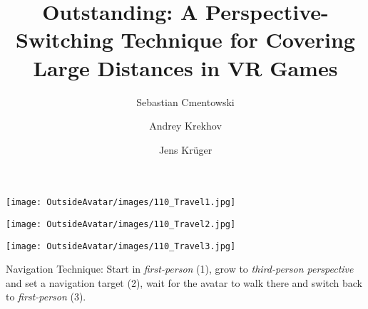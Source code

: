 \documentclass[sigchi-a, authorversion]{acmart}
\begin{document}
\title{Outstanding: A Perspective- Switching Technique for Covering Large Distances in VR Games}

\author{Sebastian Cmentowski}

\author{Andrey Krekhov}

\author{Jens Kr\"uger}



\renewcommand{\shortauthors}{S. Cmentowski et al.}


\begin{marginfigure}
     \begin{minipage}{\marginparwidth} 
    \texttt{[image: OutsideAvatar/images/110\_Travel1.jpg]}
    \vspace{0.25em}
    
    \texttt{[image: OutsideAvatar/images/110\_Travel2.jpg]}
    \vspace{0.25em}
    
    \texttt{[image: OutsideAvatar/images/110\_Travel3.jpg]}
    \end{minipage}
    \caption{Navigation Technique: Start in \textit{first-person} (1), grow to \textit{third-person perspective} and set a navigation target (2), wait for the avatar to walk there and switch back to \textit{first-person} (3).}~\label{fig:nvigation}
\end{marginfigure}
\end{document}
